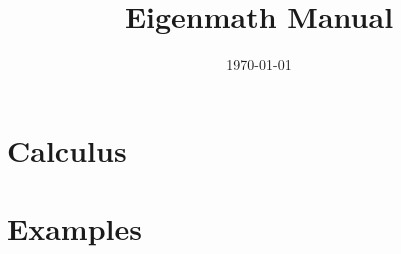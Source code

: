 \documentclass[11pt]{article}
\title{Eigenmath Manual}
\date{\today}
\begin{document}
\maketitle

\newpage

\tableofcontents

\newpage


















\section{Calculus}












\section{Examples}










\newpage



\newpage



\end{document}
